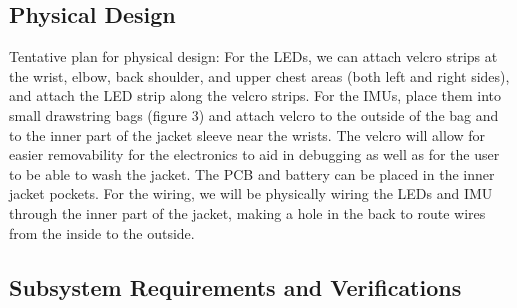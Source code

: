 \documentclass[12pt]{article}
\begin{document}
\subsection{Physical Design}
Tentative plan for physical design: For the LEDs, we can attach velcro strips at the wrist, elbow, back shoulder, and upper chest areas (both left and right sides), and attach the LED strip along the velcro strips. For the IMUs, place them into small drawstring bags (figure 3) and attach velcro to the outside of the bag and to the inner part of the jacket sleeve near the wrists. The velcro will allow for easier removability for the electronics to aid in debugging as well as for the user to be able to wash the jacket. The PCB and battery can be placed in the inner jacket pockets. For the wiring, we will be physically wiring the LEDs and IMU through the inner part of the jacket, making a hole in the back to route wires from the inside to the outside. 
\subsection{Subsystem Requirements and Verifications}
\end{document}
